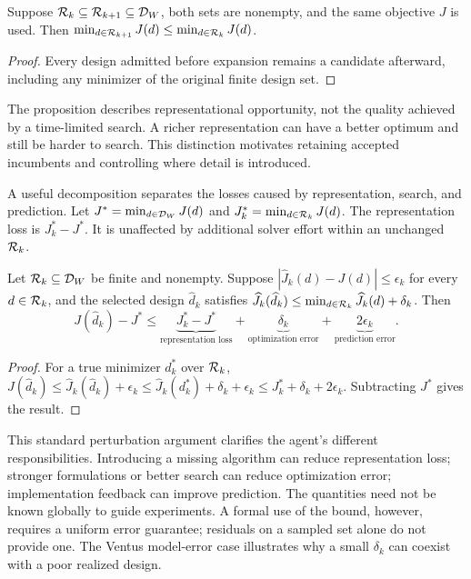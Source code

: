 \begin{proposition}\label{prop:expansion}
Suppose $\mathcal R_k\subseteq\mathcal R_{k+1}\subseteq\mathcal D_W$, both sets are nonempty, and the same objective $J$ is used. Then
$\min_{d\in\mathcal R_{k+1}}J(d)\le\min_{d\in\mathcal R_k}J(d)$.
\end{proposition}
\begin{proof}
Every design admitted before expansion remains a candidate afterward, including any minimizer of the original finite design set.
\end{proof}
The proposition describes representational opportunity, not the quality achieved by a time-limited search. A richer representation can have a better optimum and still be harder to search. This distinction motivates retaining accepted incumbents and controlling where detail is introduced.

A useful decomposition separates the losses caused by representation, search, and prediction. Let $J^*=\min_{d\in\mathcal D_W}J(d)$ and $J_k^*=\min_{d\in\mathcal R_k}J(d)$. The representation loss is $J_k^*-J^*$. It is unaffected by additional solver effort within an unchanged $\mathcal R_k$.

\begin{proposition}\label{prop:loss}
Let $\mathcal R_k\subseteq\mathcal D_W$ be finite and nonempty. Suppose $|\widehat J_k(d)-J(d)|\le\epsilon_k$ for every $d\in\mathcal R_k$, and the selected design $\widehat d_k$ satisfies
$\widehat J_k(\widehat d_k)\le\min_{d\in\mathcal R_k}\widehat J_k(d)+\delta_k$.
Then
\begin{equation}
 J(\widehat d_k)-J^*
 \le \underbrace{J_k^*-J^*}_{\text{representation loss}}
 +\underbrace{\delta_k}_{\text{optimization error}}
 +\underbrace{2\epsilon_k}_{\text{prediction error}}.\label{eq:loss}
\end{equation}
\end{proposition}
\begin{proof}
For a true minimizer $d_k^*$ over $\mathcal R_k$,
$J(\widehat d_k)\le\widehat J_k(\widehat d_k)+\epsilon_k
\le\widehat J_k(d_k^*)+\delta_k+\epsilon_k
\le J_k^*+\delta_k+2\epsilon_k$.
Subtracting $J^*$ gives the result.
\end{proof}

This standard perturbation argument clarifies the agent's different responsibilities. Introducing a missing algorithm can reduce representation loss; stronger formulations or better search can reduce optimization error; implementation feedback can improve prediction. The quantities need not be known globally to guide experiments. A formal use of the bound, however, requires a uniform error guarantee; residuals on a sampled set alone do not provide one. The Ventus model-error case illustrates why a small $\delta_k$ can coexist with a poor realized design.

